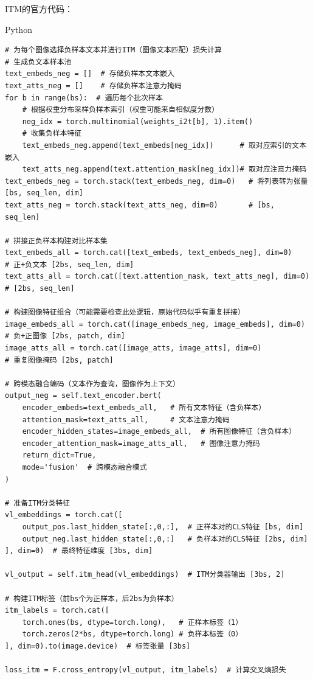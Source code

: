 \documentclass[zihao=false,fontset=windows]{ctexart}
\begin{document}
ITM的官方代码：\par
\begin{feishucode}
{\small\ttfamily\color{feishuGray}Python}\par\vspace{-0.15em}
\begin{lstlisting}
# 为每个图像选择负样本文本并进行ITM（图像文本匹配）损失计算
# 生成负文本样本池
text_embeds_neg = []  # 存储负样本文本嵌入
text_atts_neg = []    # 存储负样本注意力掩码
for b in range(bs):  # 遍历每个批次样本
    # 根据权重分布采样负样本索引（权重可能来自相似度分数）
    neg_idx = torch.multinomial(weights_i2t[b], 1).item()  
    # 收集负样本特征
    text_embeds_neg.append(text_embeds[neg_idx])      # 取对应索引的文本嵌入
    text_atts_neg.append(text.attention_mask[neg_idx])# 取对应注意力掩码
text_embeds_neg = torch.stack(text_embeds_neg, dim=0)   # 将列表转为张量 [bs, seq_len, dim]
text_atts_neg = torch.stack(text_atts_neg, dim=0)       # [bs, seq_len]

# 拼接正负样本构建对比样本集
text_embeds_all = torch.cat([text_embeds, text_embeds_neg], dim=0)     # 正+负文本 [2bs, seq_len, dim]
text_atts_all = torch.cat([text.attention_mask, text_atts_neg], dim=0) # [2bs, seq_len]

# 构建图像特征组合（可能需要检查此处逻辑，原始代码似乎有重复拼接）
image_embeds_all = torch.cat([image_embeds_neg, image_embeds], dim=0)  # 负+正图像 [2bs, patch, dim]
image_atts_all = torch.cat([image_atts, image_atts], dim=0)            # 重复图像掩码 [2bs, patch]

# 跨模态融合编码（文本作为查询，图像作为上下文）
output_neg = self.text_encoder.bert(
    encoder_embeds=text_embeds_all,   # 所有文本特征（含负样本）
    attention_mask=text_atts_all,     # 文本注意力掩码
    encoder_hidden_states=image_embeds_all,  # 所有图像特征（含负样本）
    encoder_attention_mask=image_atts_all,   # 图像注意力掩码  
    return_dict=True,
    mode='fusion'  # 跨模态融合模式
)                         

# 准备ITM分类特征
vl_embeddings = torch.cat([
    output_pos.last_hidden_state[:,0,:],  # 正样本对的CLS特征 [bs, dim]
    output_neg.last_hidden_state[:,0,:]   # 负样本对的CLS特征 [2bs, dim]
], dim=0)  # 最终特征维度 [3bs, dim]

vl_output = self.itm_head(vl_embeddings)  # ITM分类器输出 [3bs, 2]

# 构建ITM标签（前bs个为正样本，后2bs为负样本）
itm_labels = torch.cat([
    torch.ones(bs, dtype=torch.long),   # 正样本标签（1）
    torch.zeros(2*bs, dtype=torch.long) # 负样本标签（0）
], dim=0).to(image.device)  # 标签张量 [3bs]

loss_itm = F.cross_entropy(vl_output, itm_labels)  # 计算交叉熵损失
\end{lstlisting}
\end{feishucode}
\end{document}
